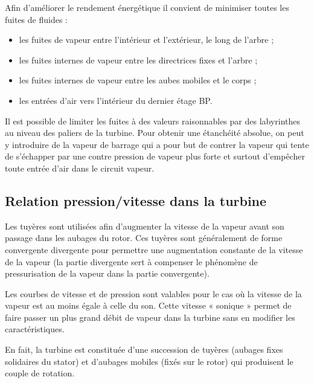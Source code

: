 Afin d’améliorer le rendement énergétique il convient de minimiser toutes les fuites de fluides :


\begin{itemize}

\item les fuites de vapeur entre l’intérieur et l’extérieur, le long de l’arbre ;
\item les fuites internes de vapeur entre les directrices fixes et l’arbre ;
\item les fuites internes de vapeur entre les aubes mobiles et le corps ;
\item les entrées d’air vers l’intérieur du dernier étage BP.


\end{itemize}

Il est possible de limiter les fuites à des valeurs raisonnables par des labyrinthes au niveau des paliers de la turbine. Pour obtenir une étanchéité absolue, on peut y introduire de la vapeur de barrage qui a pour but de contrer la vapeur qui tente de s’échapper par une contre pression de vapeur plus forte et surtout d’empêcher toute entrée d’air dans le circuit vapeur.



\subsection{Relation pression/vitesse dans la turbine} 

Les tuyères sont utilisées afin d’augmenter la vitesse de la vapeur avant son passage dans les aubages du rotor. Ces tuyères sont généralement de forme convergente divergente pour permettre une augmentation constante de la vitesse de la vapeur (la partie divergente sert à compenser le phénomène de pressurisation de la vapeur dans la partie convergente).
\vspace{0.3cm}

Les courbes de vitesse et de pression sont valables pour le cas où la vitesse de la vapeur est au moins égale à celle du son. Cette vitesse « sonique » permet de faire passer un plus grand débit de vapeur dans la turbine sans en modifier les caractéristiques.
\vspace{0.3cm}

En fait, la turbine est constituée d’une succession de tuyères (aubages fixes solidaires du stator) et d’aubages mobiles (fixés sur le rotor) qui produisent le couple de rotation.
\vspace{0.3cm}

